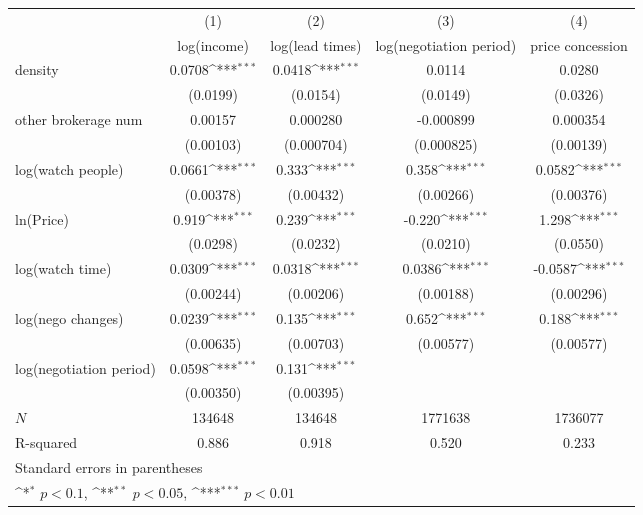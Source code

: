 {
\def\sym#1{\ifmmode^{#1}\else\(^{#1}\)\fi}
\begin{tabular}{l*{4}{c}}
\toprule
            &\multicolumn{1}{c}{(1)}&\multicolumn{1}{c}{(2)}&\multicolumn{1}{c}{(3)}&\multicolumn{1}{c}{(4)}\\
            &\multicolumn{1}{c}{log(income)}&\multicolumn{1}{c}{log(lead times)}&\multicolumn{1}{c}{log(negotiation period)}&\multicolumn{1}{c}{price concession}\\
\midrule
density     &      0.0708\sym{***}&      0.0418\sym{***}&      0.0114         &      0.0280         \\
            &    (0.0199)         &    (0.0154)         &    (0.0149)         &    (0.0326)         \\
\addlinespace
other brokerage num  &     0.00157         &    0.000280         &   -0.000899         &    0.000354         \\
            &   (0.00103)         &  (0.000704)         &  (0.000825)         &   (0.00139)         \\
\addlinespace
log(watch people)&      0.0661\sym{***}&       0.333\sym{***}&       0.358\sym{***}&      0.0582\sym{***}\\
            &   (0.00378)         &   (0.00432)         &   (0.00266)         &   (0.00376)         \\
\addlinespace
ln(Price)&       0.919\sym{***}&       0.239\sym{***}&      -0.220\sym{***}&       1.298\sym{***}\\
            &    (0.0298)         &    (0.0232)         &    (0.0210)         &    (0.0550)         \\
\addlinespace
log(watch time)&      0.0309\sym{***}&      0.0318\sym{***}&      0.0386\sym{***}&     -0.0587\sym{***}\\
            &   (0.00244)         &   (0.00206)         &   (0.00188)         &   (0.00296)         \\
\addlinespace
log(nego changes)&      0.0239\sym{***}&       0.135\sym{***}&       0.652\sym{***}&       0.188\sym{***}\\
            &   (0.00635)         &   (0.00703)         &   (0.00577)         &   (0.00577)         \\
\addlinespace
log(negotiation period)&      0.0598\sym{***}&       0.131\sym{***}&                     &                     \\
            &   (0.00350)         &   (0.00395)         &                     &                     \\
\midrule
\(N\)       &      134648         &      134648         &     1771638         &     1736077         \\
R-squared   &       0.886         &       0.918         &       0.520         &       0.233         \\
\bottomrule
\multicolumn{5}{l}{\footnotesize Standard errors in parentheses}\\
\multicolumn{5}{l}{\footnotesize \sym{*} \(p<0.1\), \sym{**} \(p<0.05\), \sym{***} \(p<0.01\)}\\
\end{tabular}
}
